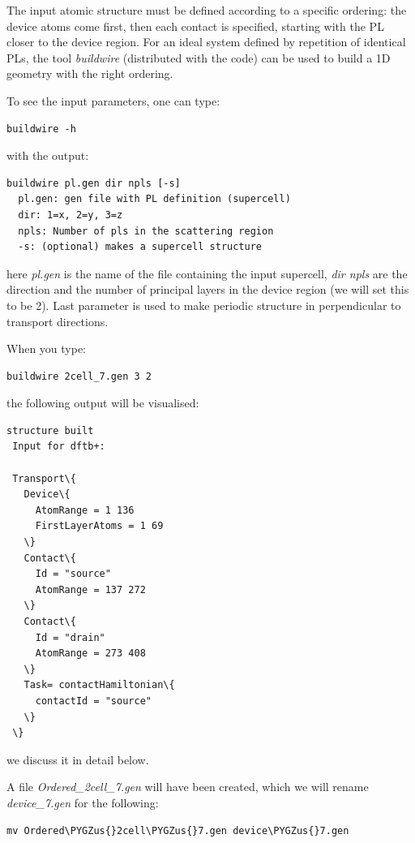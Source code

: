 \documentclass[a4paper,11pt,english]{sphinxmanual}
\def\PYGZus{\char`\_}
\begin{document}
{{The input atomic structure must be defined according to a specific
ordering: the device atoms come first, then each contact is specified,
starting with the PL closer to the device region. For an ideal system
defined by repetition of identical PLs, the tool \emph{buildwire}
(distributed with the code) can be used to build a 1D geometry with
the right ordering.

To see the input parameters, one can type:
\begin{Verbatim}[commandchars=\\\{\}]
  buildwire -h
\end{Verbatim}
%
with the output:
%
\begin{Verbatim}[commandchars=\\\{\}]
  buildwire pl.gen dir npls [-s]
  pl.gen: gen file with PL definition (supercell)
  dir: 1=x, 2=y, 3=z
  npls: Number of pls in the scattering region
  -s: (optional) makes a supercell structure
\end{Verbatim}
%
here \emph{pl.gen} is the name of the file containing the input supercell,  \emph{dir npls} are the direction and the number of principal layers in the
device region (we will set this to be 2). Last parameter is used to make periodic structure in perpendicular to transport directions. 
  
When you type:
%
\begin{Verbatim}[commandchars=\\\{\}]
  buildwire 2cell_7.gen 3 2
\end{Verbatim}
%
the following output will be visualised:
%
\begin{Verbatim}[commandchars=\\\{\}]
 structure built
 Input for dftb+:

 Transport\{
   Device\{
     AtomRange = 1 136
     FirstLayerAtoms = 1 69
   \}
   Contact\{
     Id = "source"
     AtomRange = 137 272
   \}
   Contact\{
     Id = "drain"
     AtomRange = 273 408
   \}
   Task= contactHamiltonian\{
     contactId = "source"
   \}
 \}  
\end{Verbatim}
%
we discuss it in detail below.

A file \emph{Ordered\_2cell\_7.gen} will have been created, which we will rename \emph{device\_7.gen} for the following:
%
\begin{Verbatim}[commandchars=\\\{\}]
mv Ordered\PYGZus{}2cell\PYGZus{}7.gen device\PYGZus{}7.gen
\end{Verbatim}

}}
\end{document}
